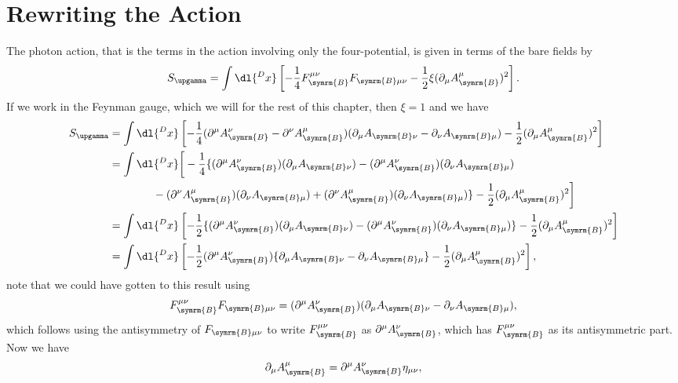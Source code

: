\documentclass[fleqn]{NotesClass}
\newcommand{\Pphoton}{\ensuremath{\upgamma}}
\newcommand{\bare}{\symrm{B}}
\newcommand{\minkowskiMetric}{\eta}
\begin{document}
    \section{Rewriting the Action}
    The photon action, that is the terms in the action involving only the four-potential, is given in terms of the bare fields by
    \begin{equation}
        S_{\Pphoton} = \int \dl{^Dx} \left[ -\frac{1}{4} F_{\bare}^{\mu\nu} F_{\bare \mu\nu} - \frac{1}{2}\xi(\partial_\mu A_{\bare}^\mu)^2 \right].
    \end{equation}
    If we work in the Feynman gauge, which we will for the rest of this chapter, then \(\xi = 1\) and we have
    \begin{align}
        S_{\Pphoton} &= \int \dl{^Dx} \left[ -\frac{1}{4}(\partial^\mu A_{\bare}^\nu - \partial^\nu A_{\bare}^\mu)(\partial_\mu A_{\bare \nu} - \partial_\nu A_{\bare \mu}) - \frac{1}{2}(\partial_\mu A_{\bare}^\mu)^2 \right]\\
        &= \int \dl{^Dx} \bigg[ -\frac{1}{4}\{(\partial^\mu A_{\bare}^\nu)(\partial_\mu A_{\bare \nu}) - (\partial^\mu A_{\bare}^\nu)(\partial_\nu A_{\bare \mu}) \notag\\
        &\qquad\qquad - (\partial^\nu A_{\bare}^\mu)(\partial_\nu A_{\bare \mu}) + (\partial^\nu A_{\bare}^\mu)(\partial_\nu A_{\bare \mu})\} - \frac{1}{2}(\partial_\mu A_{\bare}^\mu)^2 \bigg]\\
        &= \int \dl{^Dx} \left[ -\frac{1}{2}\{(\partial^\mu A_{\bare}^\nu)(\partial_\mu A_{\bare\nu}) - (\partial^\mu A_{\bare}^\nu)(\partial_\nu A_{\bare \mu})\} - \frac{1}{2}(\partial_\mu A_{\bare}^\mu)^2 \right]\\
        &= \int \dl{^Dx} \left[ -\frac{1}{2}(\partial^\mu A_{\bare}^\nu)\{\partial_\mu A_{\bare\nu} - \partial_\nu A_{\bare \mu}\} - \frac{1}{2} (\partial_\mu A_{\bare}^\mu)^2 \right],
    \end{align}
    note that we could have gotten to this result using
    \begin{equation}
        F_{\bare}^{\mu\nu}F_{\bare \mu\nu} = (\partial^\mu A_{\bare}^\nu)(\partial_\mu A_{\bare \nu} - \partial_\nu A_{\bare \mu}),
    \end{equation}
    which follows using the antisymmetry of \(F_{\bare \mu\nu}\) to write \(F_{\bare}^{\mu\nu}\) as \(\partial^\mu A_{\bare}^\nu\), which has \(F_{\bare}^{\mu\nu}\) as its antisymmetric part.
    Now we have
    \begin{equation}
        \partial_\mu A_{\bare}^\mu = \partial^\mu A_{\bare}^\nu \minkowskiMetric_{\mu\nu},
    \end{equation}
\end{document}
